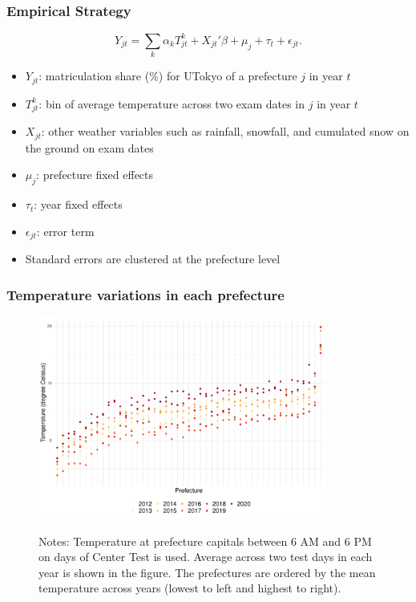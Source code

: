 \documentclass[9pt, pdfmx,hiresbb]{beamer}
\begin{document}
\begin{frame}\frametitle{Empirical Strategy}
  \begin{equation*}
    Y_{jt} = \sum_k \alpha_k T_{jt}^k + X_{jt}' \beta + \mu_j + \tau_t + \epsilon_{jt}.
  \end{equation*}
  \begin{itemize}
    \item $Y_{jt}$: matriculation share (\%) for UTokyo of a prefecture $j$ in year $t$
    \item $T_{jt}^k$: bin of average temperature across two exam dates in $j$ in year $t$
    \item $X_{jt}$: other weather variables such as rainfall, snowfall, and cumulated snow on the ground on exam dates
    \item $\mu_j$: prefecture fixed effects
    \item $\tau_t$: year fixed effects
    \item $\epsilon_{jt}$: error term
    \item Standard errors are clustered at the prefecture level
  \end{itemize}
\end{frame}

\begin{frame}\frametitle{Temperature variations in each prefecture}
  \begin{center}
    \begin{figure}
      \includegraphics[width=9.5cm]{../Output/images/temperature_diff.pdf}
      \tiny
      \begin{tablenotes}
      \item Notes:
        Temperature at prefecture capitals between 6 AM and 6 PM on days of Center Test is used.
        Average across two test days in each year is shown in the figure.
        The prefectures are ordered by the mean temperature across years (lowest to left and highest to right).
      \end{tablenotes}
    \end{figure}
  \end{center}
\end{frame}
\end{document}
